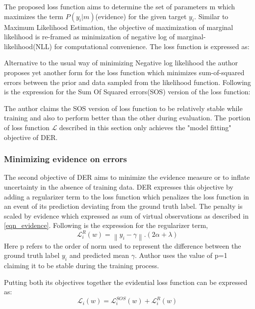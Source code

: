 	The proposed loss function aims to determine the set of parameters m which maximizes the term $P(y_i|m)$(evidence) for the given target $y_i$. Similar to Maximum Likelihood Estimation, the objective of maximization of marginal likelihood is re-framed as minimization of negative log of marginal-likelihood(NLL) for computational convenience.
	The loss function is expressed as:
	
	Alternative to the usual way of minimizing Negative log likelihood the author proposes yet another form for the loss function which minimizes sum-of-squared errors between the prior and data sampled from the likelihood function. Following is the expression for the Sum Of Squared errors(SOS) version of the loss function:
	
	The author claims the SOS version of loss function to be relatively stable while training and also to perform better than the other during evaluation. The portion of loss function $\mathcal{L}$ described in this section only achieves the "model fitting" objective of DER. 
	
	\subsubsection{Minimizing evidence on errors}
	The second objective of DER aims to minimize the evidence measure or to inflate uncertainty in the absence of training data. DER expresses this objective by adding a regularizer term to the loss function which penalizes the loss function in an event of its prediction deviating from the ground truth label. The penalty is scaled by evidence which expressed as sum of virtual observations as described in \ref{eqn_evidence}. Following is the expression for the regularizer term,
	\begin{equation}
		\mathcal{L}_{i}^R(w) = \left\| {y_i - \gamma}\right\|.(2\alpha+\lambda)
	\end{equation}
	Here p refers to the order of norm used to represent the difference between the ground truth label $y_i$ and predicted mean $\gamma$. Author uses the value of p=1 claiming it to be stable during the training process.
	
	Putting both its objectives together the evidential loss function can be expressed as:
	\begin{equation}
		\mathcal{L}_i(w) = \mathcal{L}_i^{SOS}(w) + \mathcal{L}_{i}^R(w)
	\end{equation}
	
